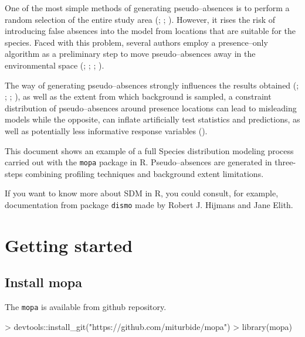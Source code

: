 \documentclass[10pt,a4paper]{report}
\begin{document}
One of the most simple methods of generating pseudo--absences is to perform a random selection of the entire study area  (\citet{jiang_satellite-derived_2014}; \citet{maria_teresa_multi-temporal_2014}; \citet{sequeira_predicting_2014}). However, it rises the risk of introducing false absences into the model from locations that are suitable for the species. Faced with this problem, several authors employ a presence--only algorithm as a preliminary step to move pseudo--absences away in the environmental space (\citet{zaniewski_predicting_2002}; \citet{engler_improved_2004}; \citet{barbet-massin_selecting_2012}; \citet{liu_species_2013}). 

The way of generating pseudo--absences strongly influences the results obtained (\citet{lobo_uncertain_2010}; \citet{wisz_pseudo-absence_2009}; \citet{barbet-massin_selecting_2012}; \citet{hirzel_assessing_2001}), as well as the extent from which background is sampled, a constraint distribution of pseudo--absences around presence locations can lead to misleading models while the opposite, can inflate artificially test statistics and predictions, as well as potentially less informative response variables  (\citet{jeremy_vanderwal_selecting_2009}).

This document shows an example of a full Species distribution modeling process carried out with the \texttt{mopa} package in R. Pseudo--absences are generated in three-steps combining profiling techniques and background extent limitations. 

If you want to know more about SDM in R, you could consult, for example, documentation from package \texttt{dismo} made by Robert J. Hijmans and Jane Elith.

\chapter{Getting started}

\section{Install mopa}

The \texttt{mopa} is available from github repository.

\begin{Schunk}
\begin{Sinput}
> devtools::install_git("https://github.com/miturbide/mopa")
> library(mopa)
\end{Sinput}
\end{Schunk}
\end{document}
